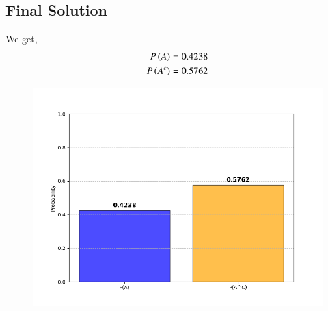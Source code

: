 \documentclass[journal]{IEEEtran}
\begin{document}
	\subsection*{Final Solution}
	We get,
    \begin{align}
        P\left(A\right)=0.4238 \\
        P\left(A^c\right)=0.5762
    \end{align}

\begin{figure}[h]
    \centering
    \includegraphics[width=\columnwidth]{figs/Figure_1.png}
    \label{fig:Plot}
    \end{figure}
\end{document}
